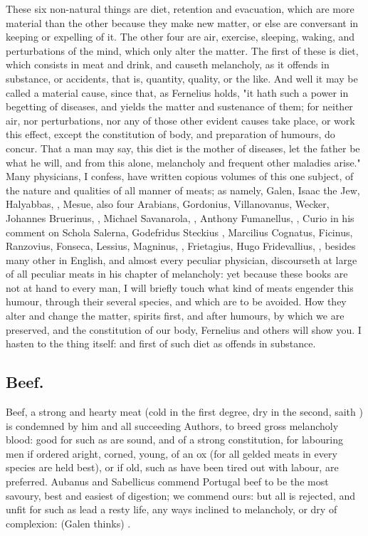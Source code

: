 These six non-natural things are diet, retention and evacuation, which are more
material than the other because they make new matter, or else are conversant in
keeping or expelling of it. The other four are air, exercise, sleeping, waking,
and perturbations of the mind, which only alter the matter. The first of these
is diet, which consists in meat and drink, and causeth melancholy, as it
offends in substance, or accidents, that is, quantity, quality, or the like.
And well it may be called a material cause, since that, as
Fernelius holds, "it hath such a power in begetting of
diseases, and yields the matter and sustenance of them; for neither air, nor
perturbations, nor any of those other evident causes take place, or work this
effect, except the constitution of body, and preparation of humours, do concur.
That a man may say, this diet is the mother of diseases, let the father be what
he will, and from this alone, melancholy and frequent other maladies arise."
Many physicians, I confess, have written copious volumes of this one subject,
of the nature and qualities of all manner of meats; as namely, Galen, Isaac the
Jew, Halyabbas, \Avicenna{}, Mesue, also four Arabians, Gordonius, Villanovanus,
Wecker, Johannes Bruerinus, , Michael
Savanarola, , Anthony Fumanellus,
, Curio in his comment on Schola
Salerna, Godefridus Steckius , Marcilius
Cognatus, Ficinus, Ranzovius, Fonseca, Lessius, Magninus,
, Frietagius, Hugo Fridevallius, \etc{},
besides many other in English, and almost every peculiar
physician, discourseth at large of all peculiar meats in his chapter of
melancholy: yet because these books are not at hand to every man, I will
briefly touch what kind of meats engender this humour, through their several
species, and which are to be avoided. How they alter and change the matter,
spirits first, and after humours, by which we are preserved, and the
constitution of our body, Fernelius and others will show you. I hasten to the
thing itself: and first of such diet as offends in substance.

\subsection{Beef.}
Beef, a strong and hearty meat (cold in the first degree, dry in the second,
saith ) is condemned by
him and all succeeding Authors, to breed gross melancholy blood: good for such
as are sound, and of a strong constitution, for labouring men if ordered
aright, corned, young, of an ox (for all gelded meats in every species are held
best), or if old, such as have been tired out with labour,
are preferred. Aubanus and Sabellicus commend Portugal beef to be the most
savoury, best and easiest of digestion; we commend ours: but all is rejected,
and unfit for such as lead a resty life, any ways inclined to melancholy, or
dry of complexion:  (Galen thinks) .


